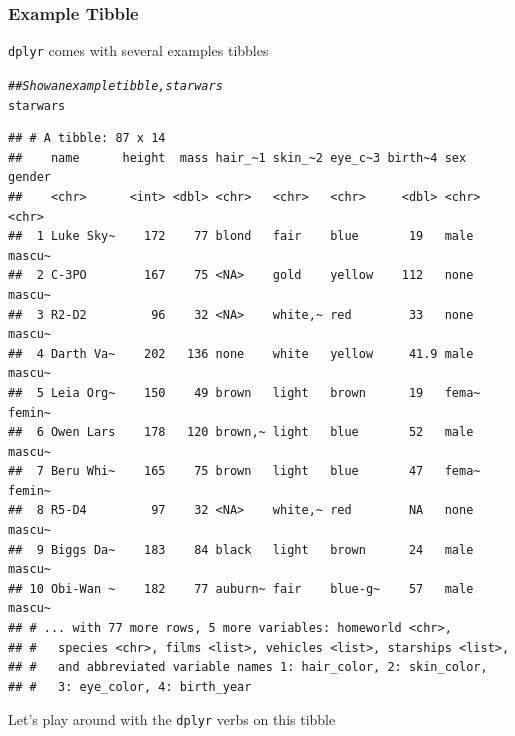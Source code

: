 \documentclass{beamer}\usepackage[]{graphicx}\usepackage[]{xcolor}
\makeatletter
\newcommand{\hlcom}[1]{\textcolor[rgb]{0.678,0.584,0.686}{\textit{#1}}}%
\newcommand{\hlstd}[1]{\textcolor[rgb]{0.345,0.345,0.345}{#1}}%
\newenvironment{kframe}{%
 \def\at@end@of@kframe{}%
 \ifinner\ifhmode%
  \def\at@end@of@kframe{\end{minipage}}%
  \begin{minipage}{\columnwidth}%
 \fi\fi%
 \def\FrameCommand##1{\hskip\@totalleftmargin \hskip-\fboxsep
 \colorbox{shadecolor}{##1}\hskip-\fboxsep
     \hskip-\linewidth \hskip-\@totalleftmargin \hskip\columnwidth}%
 \MakeFramed {\advance\hsize-\width
   \@totalleftmargin\z@ \linewidth\hsize
   \@setminipage}}%
 {\par\unskip\endMakeFramed%
 \at@end@of@kframe}
\newenvironment{knitrout}{}{} %
\makeatother
\begin{document}
\begin{frame}[fragile]\frametitle{Example Tibble}
    \texttt{dplyr} comes with several examples tibbles
\begin{knitrout}\footnotesize
{}\color{fgcolor}\begin{kframe}
\begin{alltt}
\hlcom{## Show an example tibble, starwars}
\hlstd{starwars}
\end{alltt}
\begin{verbatim}
## # A tibble: 87 x 14
##    name      height  mass hair_~1 skin_~2 eye_c~3 birth~4 sex   gender
##    <chr>      <int> <dbl> <chr>   <chr>   <chr>     <dbl> <chr> <chr> 
##  1 Luke Sky~    172    77 blond   fair    blue       19   male  mascu~
##  2 C-3PO        167    75 <NA>    gold    yellow    112   none  mascu~
##  3 R2-D2         96    32 <NA>    white,~ red        33   none  mascu~
##  4 Darth Va~    202   136 none    white   yellow     41.9 male  mascu~
##  5 Leia Org~    150    49 brown   light   brown      19   fema~ femin~
##  6 Owen Lars    178   120 brown,~ light   blue       52   male  mascu~
##  7 Beru Whi~    165    75 brown   light   blue       47   fema~ femin~
##  8 R5-D4         97    32 <NA>    white,~ red        NA   none  mascu~
##  9 Biggs Da~    183    84 black   light   brown      24   male  mascu~
## 10 Obi-Wan ~    182    77 auburn~ fair    blue-g~    57   male  mascu~
## # ... with 77 more rows, 5 more variables: homeworld <chr>,
## #   species <chr>, films <list>, vehicles <list>, starships <list>,
## #   and abbreviated variable names 1: hair_color, 2: skin_color,
## #   3: eye_color, 4: birth_year
\end{verbatim}
\end{kframe}
\end{knitrout}
    Let's play around with the \texttt{dplyr} verbs on this tibble
\end{frame}
\end{document}
